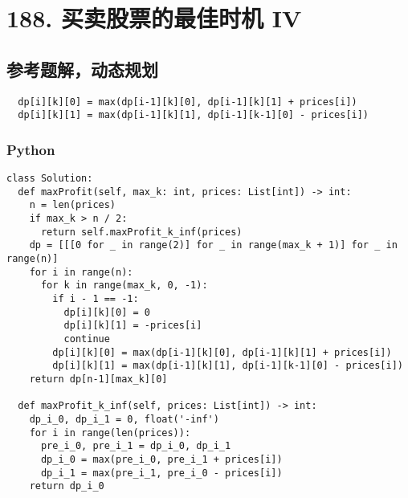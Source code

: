 \newpage
\section{188. 买卖股票的最佳时机 IV}
\label{leetcode:188}

\subsection{参考题解，动态规划}

\begin{verbatim}
  dp[i][k][0] = max(dp[i-1][k][0], dp[i-1][k][1] + prices[i])
  dp[i][k][1] = max(dp[i-1][k][1], dp[i-1][k-1][0] - prices[i])
\end{verbatim}

\subsubsection{Python}

\begin{verbatim}
class Solution:
  def maxProfit(self, max_k: int, prices: List[int]) -> int:
    n = len(prices)
    if max_k > n / 2:
      return self.maxProfit_k_inf(prices)
    dp = [[[0 for _ in range(2)] for _ in range(max_k + 1)] for _ in range(n)]
    for i in range(n):
      for k in range(max_k, 0, -1):
        if i - 1 == -1:
          dp[i][k][0] = 0
          dp[i][k][1] = -prices[i]
          continue
        dp[i][k][0] = max(dp[i-1][k][0], dp[i-1][k][1] + prices[i])
        dp[i][k][1] = max(dp[i-1][k][1], dp[i-1][k-1][0] - prices[i])
    return dp[n-1][max_k][0]

  def maxProfit_k_inf(self, prices: List[int]) -> int:
    dp_i_0, dp_i_1 = 0, float('-inf')
    for i in range(len(prices)):
      pre_i_0, pre_i_1 = dp_i_0, dp_i_1
      dp_i_0 = max(pre_i_0, pre_i_1 + prices[i])
      dp_i_1 = max(pre_i_1, pre_i_0 - prices[i])
    return dp_i_0
\end{verbatim}
